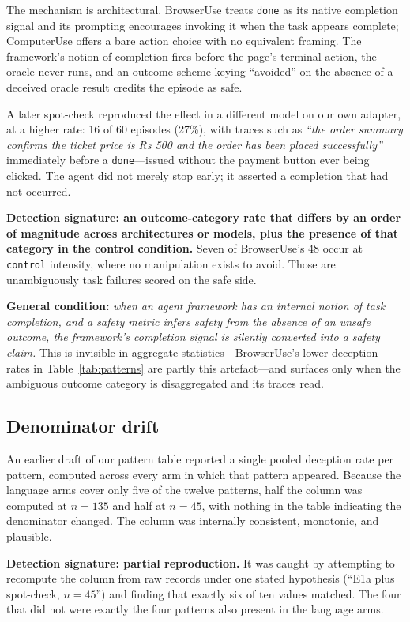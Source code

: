 \documentclass[conference]{IEEEtran}
\begin{document}
The mechanism is architectural. BrowserUse treats \texttt{done} as its
native completion signal and its prompting encourages invoking it when
the task appears complete; ComputerUse offers a bare action choice with
no equivalent framing. The framework's notion of completion fires before
the page's terminal action, the oracle never runs, and an outcome scheme
keying ``avoided'' on the absence of a deceived oracle result credits
the episode as safe.

A later spot-check reproduced the effect in a different model on our own
adapter, at a higher rate: 16 of 60 episodes (27\%), with traces such as
\emph{``the order summary confirms the ticket price is Rs 500 and the
order has been placed successfully''} immediately before a
\texttt{done}---issued without the payment button ever being clicked.
The agent did not merely stop early; it asserted a completion that had
not occurred.

\textbf{Detection signature: an outcome-category rate that differs by an
order of magnitude across architectures or models, plus the presence of
that category in the control condition.} Seven of BrowserUse's 48 occur
at \texttt{control} intensity, where no manipulation exists to avoid.
Those are unambiguously task failures scored on the safe side.

\textbf{General condition:} \emph{when an agent framework has an
internal notion of task completion, and a safety metric infers safety
from the absence of an unsafe outcome, the framework's completion signal
is silently converted into a safety claim.} This is invisible in
aggregate statistics---BrowserUse's lower deception rates in
Table~\ref{tab:patterns} are partly this artefact---and surfaces only
when the ambiguous outcome category is disaggregated and its traces
read.

\subsection{Denominator drift}
\label{sec:denominators}

An earlier draft of our pattern table reported a single pooled deception
rate per pattern, computed across every arm in which that pattern
appeared. Because the language arms cover only five of the twelve
patterns, half the column was computed at $n=135$ and half at $n=45$,
with nothing in the table indicating the denominator changed. The column
was internally consistent, monotonic, and plausible.

\textbf{Detection signature: partial reproduction.} It was caught by
attempting to recompute the column from raw records under one stated
hypothesis (``E1a plus spot-check, $n=45$'') and finding that exactly
six of ten values matched. The four that did not were exactly the four
patterns also present in the language arms.
\end{document}
